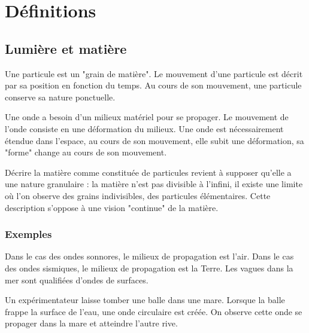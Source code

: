 
\section{Définitions}
%
\subsection{Lumière et matière}

Une particule est un "grain de matière". Le mouvement d'une particule est décrit par sa position en fonction du temps. Au cours de son mouvement, une particule conserve sa nature ponctuelle.


Une onde a besoin d'un milieux matériel pour se propager. Le mouvement de l'onde consiste en une déformation du milieux. Une onde est nécessairement étendue dans l'espace, au cours de son mouvement, elle subit une déformation, sa "forme" change au cours de son mouvement.


Décrire la matière comme constituée de particules revient à supposer qu'elle a une nature granulaire : la matière n'est pas divisible à l'infini, il existe une limite où l'on observe des grains indivisibles, des particules élémentaires. Cette description s'oppose à une vision "continue" de la matière.

\subsubsection{Exemples}



Dans le cas des ondes sonnores, le milieux de propagation est l'air. Dans le cas des ondes sismiques, le milieux de propagation est la Terre. Les vagues dans la mer sont qualifiées d'ondes de surfaces.

\vspace{0.5cm}
\begin{minipage}[c]{.45\linewidth}

\end{minipage}
\hfill
\begin{minipage}[c]{.45\linewidth}
Un expérimentateur laisse tomber une balle dans une mare. Lorsque la balle frappe la surface de l'eau, une onde circulaire est créée. On observe cette onde se propager dans la mare et atteindre l'autre rive.
\end{minipage}

